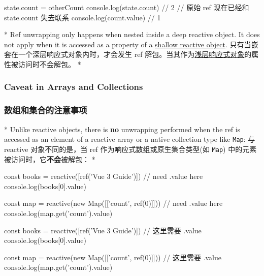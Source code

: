 \begin{paracol}{2}
\begin{codeJs}
state.count = otherCount
console.log(state.count) // 2
// 原始 ref 现在已经和 state.count 失去联系
console.log(count.value) // 1
\end{codeJs}
\switchcolumn[0]*%
Ref unwrapping only happens when nested inside a deep reactive object.
It does not apply when it is accessed as a property of a
\href{https://vuejs.org/api/reactivity-advanced.html\#shallowreactive}{shallow
reactive object}.
\switchcolumn
只有当嵌套在一个深层响应式对象内时，才会发生 ref
解包。当其作为\href{https://cn.vuejs.org/api/reactivity-advanced.html\#shallowreactive}{浅层响应式对象}的属性被访问时不会解包。
\switchcolumn[0]*%
\subsubsection{Caveat in Arrays and Collections}
\switchcolumn
\subsubsection{数组和集合的注意事项}
\switchcolumn[0]*%
Unlike reactive objects, there is \textbf{no} unwrapping performed when
the ref is accessed as an element of a reactive array or a native
collection type like \texttt{Map}:
\switchcolumn
与 reactive 对象不同的是，当 ref 作为响应式数组或原生集合类型(如
\texttt{Map}) 中的元素被访问时，它\textbf{不会}被解包：
\switchcolumn[0]*%
\begin{codeJs}
const books = reactive([ref('Vue 3 Guide')])
// need .value here
console.log(books[0].value)

const map = reactive(new Map([['count', ref(0)]]))
// need .value here
console.log(map.get('count').value)
\end{codeJs}
\switchcolumn
\begin{codeJs}
const books = reactive([ref('Vue 3 Guide')])
// 这里需要 .value
console.log(books[0].value)

const map = reactive(new Map([['count', ref(0)]]))
// 这里需要 .value
console.log(map.get('count').value)
\end{codeJs}
\end{paracol}

